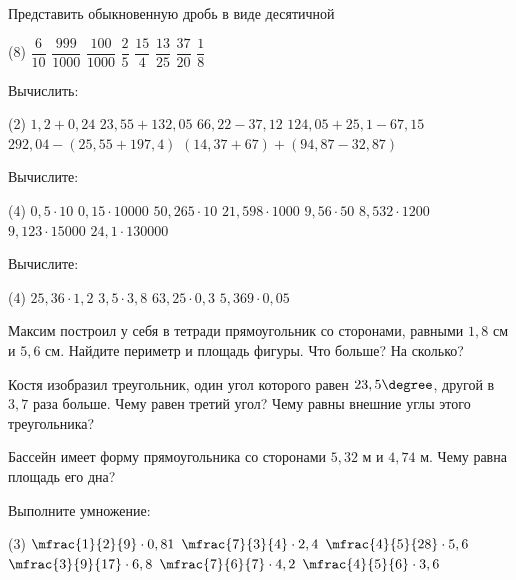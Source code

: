 \begin{class}[number=2]
	\begin{listofex}
		\item Представить обыкновенную дробь в виде десятичной
		\begin{tasks}(8)
			\task \( \dfrac{6}{10} \)
			\task \( \dfrac{999}{1000} \)
			\task \( \dfrac{100}{1000} \)
			\task \( \dfrac{2}{5} \)
			\task \( \dfrac{15}{4} \)
			\task \( \dfrac{13}{25} \)
			\task \( \dfrac{37}{20} \)
			\task \( \dfrac{1}{8} \)
		\end{tasks}
		\item Вычислить:
		\begin{tasks}(2)
			\task \( 1,2+0,24 \)
			\task \( 23,55+132,05 \)
			\task \( 66,22-37,12 \)
			\task \( 124,05+25,1-67,15 \)
			\task \( 292,04-(25,55+197,4) \)
			\task \( (14,37+67)+(94,87-32,87) \)
		\end{tasks}
		\item Вычислите:
		\begin{tasks}(4)
			\task \( 0,5\cdot10 \)
			\task \( 0,15\cdot10000 \)
			\task \( 50,265\cdot10 \)
			\task \( 21,598\cdot1000 \)
			\task \( 9,56\cdot50 \)
			\task \( 8,532\cdot1200 \)
			\task \( 9,123\cdot15000 \)
			\task \( 24,1\cdot130000 \)
		\end{tasks}
		\item Вычислите:
		\begin{tasks}(4)
			\task \( 25,36\cdot1,2 \)
			\task \( 3,5\cdot3,8 \)
			\task \( 63,25\cdot0,3 \)
			\task \( 5,369\cdot0,05 \)
		\end{tasks}
		\item Максим построил у себя в тетради прямоугольник со сторонами, равными \( 1,8 \) см и \( 5,6 \) см. Найдите периметр и площадь фигуры. Что больше? На сколько?
		\item Костя изобразил треугольник, один угол которого равен \( 23,5\degree \), другой в \( 3,7 \) раза больше. Чему равен третий угол? Чему равны внешние углы этого треугольника?
		\item Бассейн имеет форму прямоугольника со сторонами \( 5,32 \) м и \( 4,74 \) м. Чему равна площадь его дна?
		\item Выполните умножение:
		\begin{tasks}(3)
			\task \( \mfrac{1}{2}{9}\cdot0,81 \)
			\task \( \mfrac{7}{3}{4}\cdot2,4 \)
			\task \( \mfrac{4}{5}{28}\cdot 5,6 \)
			\task \( \mfrac{3}{9}{17} \cdot 6,8 \)
			\task \( \mfrac{7}{6}{7}\cdot 4,2 \)
			\task \( \mfrac{4}{5}{6}\cdot3,6 \)

\end{tasks}
\end{listofex}
\end{class}
